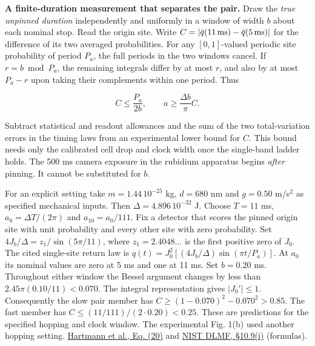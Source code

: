 \documentclass[11pt,a4paper]{article}
\begin{document}
\textbf{A finite-duration measurement that separates the pair.} Draw the
\emph{true unpinned duration} independently and uniformly in a window of
width \(b\) about each nominal stop. Read the origin site. Write
\(C=|\bar q(11\,{\rm ms})-\bar q(5\,{\rm ms})|\) for the difference of
its two averaged probabilities. For any \([0,1]\)-valued periodic site
probability of period \(P_a\), the full periods in the two windows
cancel. If \(r=b\bmod P_a\), the remaining integrals differ by at most
\(r\), and also by at most \(P_a-r\) upon taking their complements
within one period. Thus

\[
                C\le\frac{P_a}{2b},\qquad
                a\ge\frac{\Delta b}{\pi}C .
\]

Subtract statistical and readout allowances and the sum of the two
total-variation errors in the timing laws from an experimental lower
bound for \(C\). This bound needs only the calibrated cell drop and
clock width once the single-band ladder holds. The 500 ms camera
exposure in the rubidium apparatus begins \emph{after} pinning. It
cannot be substituted for \(b\).

For an explicit setting take \(m=1.44\,10^{-25}\) kg, \(d=680\) nm and
\(g=0.50\) m/s\(^2\) as specified mechanical inputs. Then
\(\Delta=4.896\,10^{-32}\) J. Choose \(T=11\) ms,
\(a_0=\Delta T/(2\pi)\) and \(a_{10}=a_0/111\). Fix a detector that
scores the pinned origin site with unit probability and every other site
with zero probability. Set \(4J_b/\Delta=z_1/\sin(5\pi/11)\), where
\(z_1=2.4048\ldots\) is the first positive zero of \(J_0\). The cited
single-site return law is \(q(t)=J_0^2[(4J_b/\Delta)\sin(\pi t/P_a)]\).
At \(a_0\) its nominal values are zero at 5 ms and one at 11 ms. Set
\(b=0.20\) ms. Throughout either window the Bessel argument changes by
less than \(2.45\pi(0.10/11)<0.070\). The integral representation gives
\(|J_0'|\le1\). Consequently the slow pair member has
\(C\ge(1-0.070)^2-0.070^2>0.85\). The fast member has
\(C\le(11/111)/(2\cdot0.20)<0.25\). These are predictions for the
specified hopping and clock window. The experimental Fig. 1(b) used
another hopping setting.
\href{https://doi.org/10.1088/1367-2630/6/1/002}{Hartmann et al., Eq.
(20)} and \href{https://dlmf.nist.gov/10.9\#i}{NIST DLMF, §10.9(i)}
(formulas).
\end{document}
